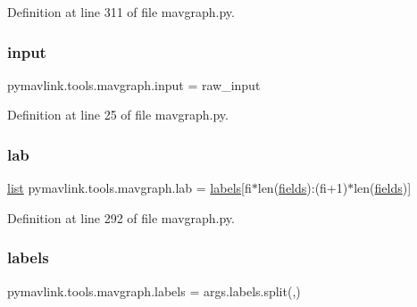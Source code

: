 Definition at line 311 of file mavgraph.\+py.

\mbox{\label{namespacepymavlink_1_1tools_1_1mavgraph_a928b14ed776682a5ebb2771542b9a0a1}} 
\subsubsection{\texorpdfstring{input}{input}}
{\footnotesize\ttfamily pymavlink.\+tools.\+mavgraph.\+input = raw\+\_\+input}



Definition at line 25 of file mavgraph.\+py.

\mbox{\label{namespacepymavlink_1_1tools_1_1mavgraph_a2dd273e216f57a44b6274cb7f46b22dc}} 
\subsubsection{\texorpdfstring{lab}{lab}}
{\footnotesize\ttfamily \mbox{\hyperlink{structlist}{list}} pymavlink.\+tools.\+mavgraph.\+lab = \mbox{\hyperlink{namespacepymavlink_1_1tools_1_1mavgraph_aaf72c6f3f198e3e828ae337eb4f800a6}{labels}}\mbox{[}fi$\ast$len(\mbox{\hyperlink{namespacepymavlink_1_1tools_1_1mavgraph_a5ba6a459d544d32a7adf561bba2386d2}{fields}})\+:(fi+1)$\ast$len(\mbox{\hyperlink{namespacepymavlink_1_1tools_1_1mavgraph_a5ba6a459d544d32a7adf561bba2386d2}{fields}})\mbox{]}}



Definition at line 292 of file mavgraph.\+py.

\mbox{\label{namespacepymavlink_1_1tools_1_1mavgraph_aaf72c6f3f198e3e828ae337eb4f800a6}} 
\subsubsection{\texorpdfstring{labels}{labels}}
{\footnotesize\ttfamily pymavlink.\+tools.\+mavgraph.\+labels = args.\+labels.\+split(\textquotesingle{},\textquotesingle{})}



